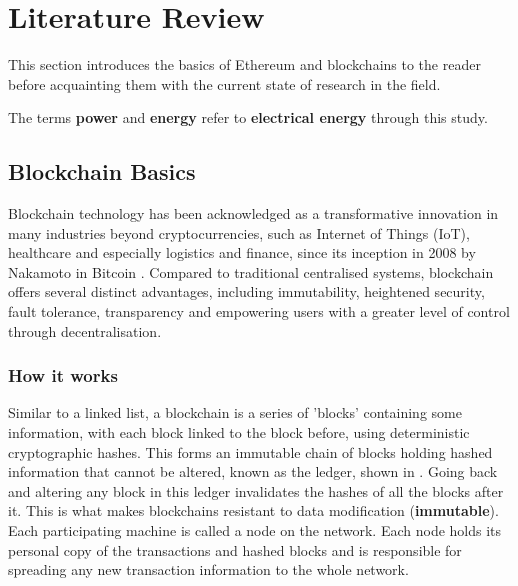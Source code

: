 \chapter{Literature Review}

This section introduces the basics of Ethereum and blockchains to the reader before acquainting them with the current state of research in the field.

The terms \textbf{power} and \textbf{energy} refer to \textbf{electrical energy} through this study. 


\section{Blockchain Basics}

Blockchain technology has been acknowledged as a transformative innovation in many industries beyond cryptocurrencies, such as Internet of Things (IoT), healthcare and especially logistics and finance, since its inception in 2008 by Nakamoto in Bitcoin \cite{NakamotoBitcoin:System}. Compared to traditional centralised systems, blockchain offers several distinct advantages, including immutability, heightened security, fault tolerance, transparency and empowering users with a greater level of control through decentralisation.

\subsection{How it works}

Similar to a linked list, a blockchain is a series of 'blocks' containing some information, with each block linked to the block before, using deterministic cryptographic hashes. This forms an immutable chain of blocks holding hashed information that cannot be altered, known as the ledger, shown in . Going back and altering any block in this ledger invalidates the hashes of all the blocks after it. This is what makes blockchains resistant to data modification (\textbf{immutable}). Each participating machine is called a node on the network. Each node holds its personal copy of the transactions and hashed blocks and is responsible for spreading any new transaction information to the whole network.

